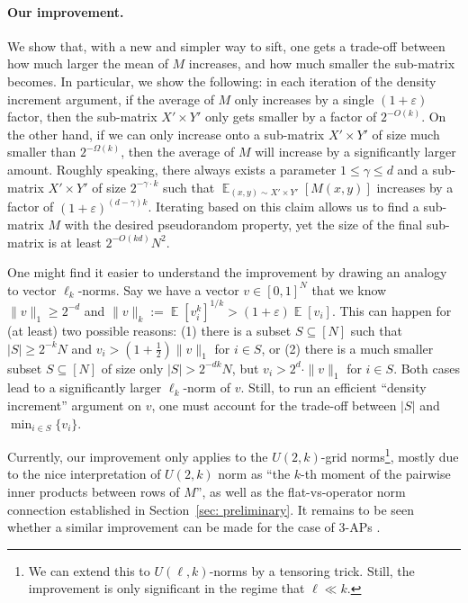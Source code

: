 \documentclass[11pt]{article}
\DeclareMathOperator*{\E}{\mathbb{E}}
\newcommand{\1}{ \mathbbm{1}}
\newcommand{\eps}{\varepsilon}
\begin{document}
\paragraph*{Our improvement.} We show that, with a new and simpler way to sift, one gets a trade-off between how much larger the mean of $M$ increases, and how much smaller the sub-matrix becomes. In particular, we show the following: in each iteration of the density increment argument, if the average of $M$ only increases by a single $(1+\eps)$ factor, then the sub-matrix $X'\times Y'$ only gets smaller by a factor of $2^{-O(k)}$. On the other hand, if we can only increase onto a sub-matrix $X'\times Y'$ of size much smaller than $2^{-\Omega(k)}$, then the average of $M$ will increase by a significantly larger amount. Roughly speaking, there always exists a parameter $1\le \gamma \le d$ and a sub-matrix $X'\times Y'$ of size $2^{-\gamma\cdot k}$ such that $\E_{(x,y)\sim X'\times Y'}[M(x,y)]$ increases by a factor of $(1+\eps)^{(d-\gamma )k}$. Iterating based on this claim allows us to find a sub-matrix $M$ with the desired pseudorandom property, yet the size of the final sub-matrix is at least $2^{-O(kd)}N^2$.

One might find it easier to understand the improvement by drawing an analogy to vector $\ell_k$-norms. Say we have a vector $v\in [0,1]^{N}$ that we know $\|v\|_1 \ge 2^{-d}$ and $\|v\|_k := \E[v_i^k]^{1/k} > (1+\eps) \E[v_i]$. This can happen for (at least) two possible reasons: (1) there is a subset $S\subseteq [N]$ such that $|S| \ge 2^{-k} N$ and $v_i > (1+\frac{1}{2})\|v\|_1$ for $i\in S$, or (2) there is a much smaller subset $S\subseteq [N]$ of size only $|S| > 2^{-dk} N$, but $v_i > 2^{d} \cdot \|v\|_1$ for $i\in S$. Both cases lead to a significantly larger $\ell_k$-norm of $v$. Still, to run an efficient ``density increment'' argument on $v$, one must account for the trade-off between $|S|$ and $\min_{i\in S}\{v_i\}$. 

Currently, our improvement only applies to the $U(2,k)$-grid norms\footnote{We can extend this to $U(\ell, k)$-norms by a tensoring trick. Still, the improvement is only significant in the regime that $\ell \ll k$.}, mostly due to the nice interpretation of $U(2,k)$ norm as ``the $k$-th moment of the pairwise inner products between rows of $M$'', as well as the flat-vs-operator norm connection established in Section~\ref{sec: preliminary}. It remains to be seen whether a similar improvement can be made for the case of 3-APs \cite{KelleyM2023strong}. %
\end{document}
